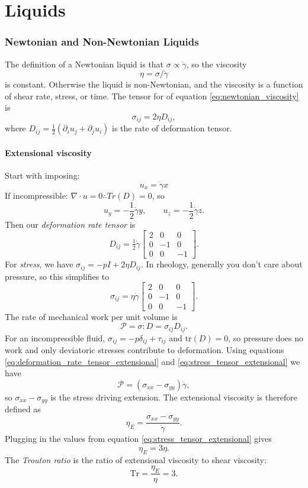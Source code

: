 \part{Liquids}
\section{Newtonian and Non-Newtonian Liquids}
The definition of a Newtonian liquid is that $\sigma \propto \dot\gamma$, so the viscosity 
\begin{equation}
	\eta = \sigma / \dot\gamma
	\label{eq:newtonian_viscosity}
\end{equation}
is constant. Otherwise the liquid is non-Newtonian, and the viscosity is a function of shear rate, stress, or time.
The tensor for of equation \ref{eq:newtonian_viscosity} is
\[
	\sigma_{ij} = 2\eta D_{ij},
\]
where $D_{ij} = \frac{1}{2}(\partial_i u_j + \partial_j u_i)$ is the rate of deformation tensor.

\subsection{Extensional viscosity}
Start with imposing:
\[ u_x = \dot\gamma x \]
If incompressible: $\nabla\cdot u = 0 \therefore Tr(D) = 0$, so 
\[
	u_y = -\frac{1}{2}\dot\gamma y, \qquad
	u_z = -\frac{1}{2}\dot\gamma z.
\]
Then our \emph{deformation rate tensor} is
\begin{equation}
	D_{ij} = \tfrac12\dot\gamma \begin{bmatrix}
		2 & 0 & 0 \\
		0 & -1 & 0 \\
		0 & 0 & -1
	\end{bmatrix}.
	\label{eq:deformation_rate_tensor_extensional}
\end{equation}
For \emph{stress}, we have
\(
	\sigma_{ij} = -pI + 2\eta D_{ij}.
\)
In rheology, generally you don't care about pressure, so this simplifies to
\begin{equation}
	\sigma_{ij} = \eta \dot\gamma \begin{bmatrix}
		2 & 0 & 0 \\
		0 & -1 & 0 \\
		0 & 0 & -1
	\end{bmatrix}.
	\label{eq:stress_tensor_extensional}
\end{equation}
The rate of mechanical work per unit volume is
\[
\mathcal{P} = \sigma : D = \sigma_{ij}D_{ij}.
\]
For an incompressible fluid, $\sigma_{ij} = -p\delta_{ij} + \tau_{ij}$ and
$\mathrm{tr}(D)=0$, so pressure does no work and only deviatoric stresses
contribute to deformation. Using equations \ref{eq:deformation_rate_tensor_extensional} and \ref{eq:stress_tensor_extensional} we have
\[
\mathcal{P} = (\sigma_{xx}-\sigma_{yy})\dot\gamma,
\]
so $\sigma_{xx}-\sigma_{yy}$ is the stress driving extension. The
extensional viscosity is therefore defined as
\[
\eta_E = \frac{\sigma_{xx}-\sigma_{yy}}{\dot\gamma}.
\]
Plugging in the values from equation \ref{eq:stress_tensor_extensional} gives
\[
\eta_E = 3\eta.
\]
The \emph{Trouton ratio} is the ratio of extensional viscosity to shear viscosity:
\[	\text{Tr} = \frac{\eta_E}{\eta} = 3.
\]


